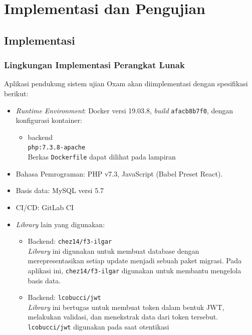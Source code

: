 \chapter{Implementasi dan Pengujian}
\label{chap:implementasi-pengujian}

\section{Implementasi}
    \subsection{Lingkungan Implementasi Perangkat Lunak}
    Aplikasi pendukung sistem ujian Oxam akan diimplementasi dengan spesifikasi berikut:
    \begin{itemize}
        \item \textit{Runtime Environment}:
            Docker versi 19.03.8, \textit{build} \texttt{afacb8b7f0}, dengan konfigurasi kontainer:
            \begin{itemize}
                \item backend\\
                    \texttt{php:7.3.8-apache}\\
                    Berkas \texttt{Dockerfile} dapat dilihat pada lampiran %
            \end{itemize}
        \item Bahasa Pemrograman: PHP v7.3, JavaScript (Babel Preset React).
        \item Basis data: MySQL versi 5.7
        \item CI/CD: GitLab CI
        \item \textit{Library} lain yang digunakan:
            \begin{itemize}
                \item Backend: \texttt{chez14/f3-ilgar} \\
                    \textit{Library} ini digunakan untuk membuat database dengan merepresentasikan setiap update
                    menjadi sebuah paket migrasi. Pada aplikasi ini, \texttt{chez14/f3-ilgar} digunakan untuk
                    membantu mengelola basis data.
                \item Backend: \texttt{lcobucci/jwt} \\
                    \textit{Library} ini bertugas untuk membuat token dalam bentuk JWT, melakukan validasi, dan
                    menekstrak data dari token tersebut. \texttt{lcobucci/jwt} digunakan pada saat otentikasi

\end{itemize}
\end{itemize}

